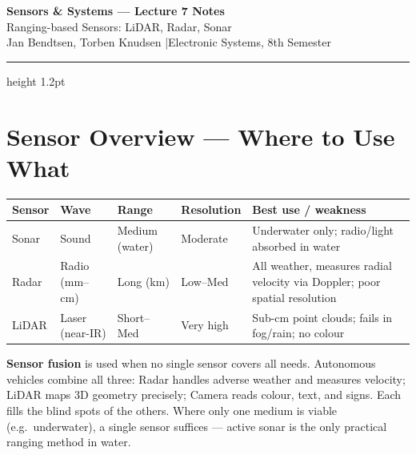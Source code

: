 \documentclass[12pt, a4paper]{article}
\begin{document}
\begin{center}
  {\LARGE\bfseries\color{headernavy} Sensors \& Systems --- Lecture 7 Notes}\\[4pt]
  {\large Ranging-based Sensors: LiDAR, Radar, Sonar}\\[2pt]
  {\normalsize Jan Bendtsen, Torben Knudsen \quad|\quad Electronic Systems, 8th Semester}
\end{center}

\vspace{4pt}
\hrule height 1.2pt
\vspace{12pt}

\section*{Sensor Overview --- Where to Use What}

\begin{center}
\renewcommand{\arraystretch}{1.4}
\begin{tabular}{p{2cm} p{2.5cm} p{2.5cm} p{2.5cm} p{4cm}}
  \toprule
  \textbf{Sensor} & \textbf{Wave} & \textbf{Range} & \textbf{Resolution} & \textbf{Best use / weakness} \\
  \midrule
  Sonar  & Sound         & Medium (water) & Moderate   & Underwater only; radio/light absorbed in water \\
  Radar  & Radio (mm--cm)& Long (km)      & Low--Med   & All weather, measures radial velocity via Doppler; poor spatial resolution \\
  LiDAR  & Laser (near-IR)& Short--Med    & Very high  & Sub-cm point clouds; fails in fog/rain; no colour \\
  \bottomrule
\end{tabular}
\end{center}

\begin{notebox}
  \textbf{Sensor fusion} is used when no single sensor covers all needs.
  Autonomous vehicles combine all three: Radar handles adverse weather and
  measures velocity; LiDAR maps 3D geometry precisely; Camera reads colour,
  text, and signs. Each fills the blind spots of the others.
  Where only one medium is viable (e.g.\ underwater), a single sensor suffices
  --- active sonar is the only practical ranging method in water.
\end{notebox}
\end{document}
